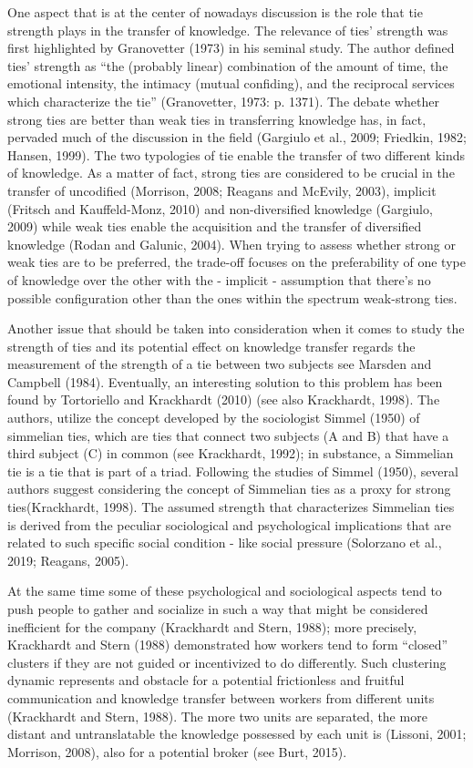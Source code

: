 \documentclass{article}
\begin{document}
One aspect that is at the center of nowadays discussion is the role that tie strength plays in the transfer of knowledge. The relevance of ties’ strength was first highlighted by Granovetter (1973) in his seminal study. The author defined ties’ strength as “the (probably linear) combination of the amount of time, the emotional intensity, the intimacy (mutual confiding), and the reciprocal services which characterize the tie” (Granovetter, 1973: p. 1371). The debate whether strong ties are better than weak ties in transferring knowledge has, in fact, pervaded much of the discussion in the field (Gargiulo et al., 2009; Friedkin, 1982; Hansen, 1999). The two typologies of tie enable the transfer of two different kinds of knowledge. As a matter of fact, strong ties are considered to be crucial in the transfer of uncodified (Morrison, 2008; Reagans and McEvily, 2003), implicit (Fritsch and Kauffeld-Monz, 2010) and non-diversified knowledge (Gargiulo, 2009) while weak ties enable the acquisition and the transfer of diversified knowledge (Rodan and Galunic, 2004). When trying to assess whether strong or weak ties are to be preferred, the trade-off focuses on the preferability of one type of knowledge over the other with the - implicit - assumption that there's no  possible configuration other than the ones within the spectrum weak-strong ties. 

Another issue that should be taken into consideration when it comes to study the strength of ties and its potential effect on knowledge transfer regards the measurement of the strength of a tie between two subjects see Marsden and Campbell (1984). Eventually, an interesting solution to this problem has been found by Tortoriello and Krackhardt (2010) (see also Krackhardt, 1998). The authors, utilize the concept developed by the sociologist Simmel (1950) of simmelian ties, which are ties that connect two subjects (A and B) that have a third subject (C) in common (see Krackhardt, 1992); in substance, a Simmelian tie is a tie that is part of a triad. Following the studies of Simmel (1950), several authors suggest considering the concept of Simmelian ties as a proxy for strong ties(Krackhardt, 1998). The assumed strength that characterizes Simmelian ties is derived from the peculiar sociological and psychological implications that are related to such specific social condition - like social pressure (Solorzano et al., 2019; Reagans, 2005).

At the same time some of these psychological and sociological aspects tend to push people to gather and socialize in such a way that might be considered inefficient for the company (Krackhardt and Stern, 1988); more precisely, Krackhardt and Stern (1988) demonstrated how workers tend to form “closed” clusters if they are not guided or incentivized to do differently. Such clustering dynamic represents and obstacle for a potential frictionless and fruitful communication and knowledge transfer between workers from different units (Krackhardt and Stern, 1988). The more two units are separated, the more distant and untranslatable the knowledge possessed by each unit is (Lissoni, 2001; Morrison, 2008), also for a potential broker (see Burt, 2015).
\end{document}
